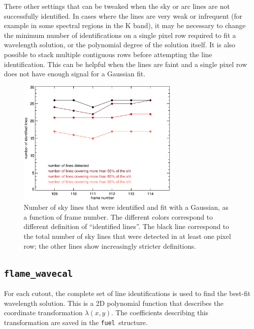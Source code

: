 \documentclass[a4paper]{article}
\newcommand{\fuel}{\texttt{fuel}}
\begin{document}
\begin{sloppypar}
There other settings that can be tweaked when the sky or arc lines are not successfully identified. In cases where the lines are very weak or infrequent (for example in some spectral regions in the K band), it may be necessary to change the minimum number of identifications on a single pixel row required to fit a wavelength solution, or the polynomial degree of the solution itself. It is also possible to stack multiple contiguous rows before attempting the line identification. This can be helpful when the lines are faint and a single pixel row does not have enough signal for a Gaussian fit.


\begin{figure}[tbp]
\centering
\includegraphics[width=0.7\textwidth]{number_lines}
\caption{Number of sky lines that were identified and fit with a Gaussian, as a function of frame number. The different colors correspond to different definition of ``identified lines''. The black line correspond to the total number of sky lines that were detected in at least one pixel row; the other lines show increasingly stricter definitions.}
\label{fig:number_lines}
\end{figure}


\subsection{\texttt{flame\_wavecal}}
\label{sec:wavecal}

For each cutout, the complete set of line identifications is used to find the best-fit wavelength solution. This is a 2D polynomial function that describes the coordinate transformation $\lambda(x,y)$. The coefficients describing this transformation are saved in the \fuel\ structure.


\end{sloppypar}
\end{document}
